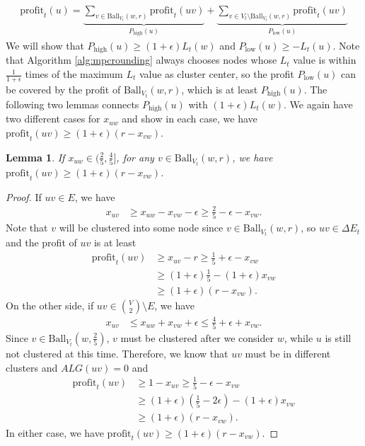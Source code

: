 \documentclass[11pt]{article}
\newtheorem{lemma}[theorem]{Lemma}
\newcommand{\ball}{\mathrm{Ball}}
\newcommand{\profit}{\mathrm{profit}}
\newcommand{\onefive}{\frac{1}{5}}
\newcommand{\twofive}{\frac{2}{5}}
\newcommand{\fourfive}{\frac{4}{5}}
\begin{document}
\begin{CJK*}{UTF8}{gbsn}
\begin{align*}
    \profit_t(u) = \underbrace{\sum_{v \in \ball_{V_t}(w, r)}\profit_t(uv)}_{P_{\textrm{high}}(u)} + \underbrace{\sum_{v \in V_t \setminus \ball_{V_t}(w, r)}\profit_t(uv)}_{P_{\textrm{low}}(u)}
\end{align*}
We will show that $P_{\textrm{high}}(u) \geq (1+\epsilon) L_t(w)$ and $P_{\textrm{low}}(u) \geq -L_t(u)$. Note that Algorithm \ref{alg:mpcrounding} always chooses nodes whose $L_t$ value is within $\frac{1}{1 + \epsilon}$ times of the maximum $L_t$ value as cluster center, so the profit $P_{\textrm{low}}(u)$ can be covered by the profit of $\ball_{V_t}(w, r)$, which is at least $P_{\textrm{high}}(u)$. The following two lemmas connects $P_{\textrm{high}}(u)$ with $(1+\epsilon) L_t(w)$. We again have two different cases for $x_{uw}$ and show in each case, we have $\profit_t(uv) \geq (1+\epsilon)(r - x_{vw})$.
\begin{lemma}
\label{lem:thirdcaseprofit}
If $x_{uw} \in (\twofive, \fourfive]$, for any $v \in \ball_{V_t}(w, r)$, we have $\profit_{t}(uv) \geq (1 + \epsilon)(r - x_{vw})$.
\end{lemma}
\begin{proof}
If $uv \in E$, we have 
\begin{align*}
    x_{uv} &\geq x_{uw} - x_{vw} - \epsilon \geq \twofive - \epsilon - x_{vw}.
\end{align*}
Note that $v$ will be clustered into some node since $v \in \ball_{V_t}(w, r)$, so $uv \in \Delta E_t$ and the profit of $uv$ is at least 
\begin{align*}
    \profit_{t}(uv) &\geq x_{uv} - r \geq \onefive + \epsilon - x_{vw} \\
    &\geq (1 + \epsilon)\onefive - (1 + \epsilon)x_{vw} \\
    &\geq (1 + \epsilon)(r - x_{vw}).
\end{align*}
On the other side, if $uv \in {V \choose 2} \setminus E$, we have 
\begin{align*}
    x_{uv} &\leq x_{uw} + x_{vw} + \epsilon \leq \fourfive + \epsilon + x_{vw}.
\end{align*}
Since $v \in \ball_{V_t}(w, \twofive)$, $v$ must be clustered after we consider $w$, while $u$ is still not clustered at this time. Therefore, we know that $uv$ must be in different clusters and $ALG(uv) = 0$ and 
\begin{align*}
    \profit_{t}(uv) &\geq 1 - x_{uv} \geq \onefive - \epsilon - x_{vw} \\
    &\geq (1 + \epsilon)(\onefive - 2\epsilon) - (1 + \epsilon)x_{vw} \\
    &\geq (1 + \epsilon)(r - x_{vw}).
\end{align*}
In either case, we have $\profit_{t}(uv) \geq (1 + \epsilon)(r - x_{vw})$.


\end{proof}
\end{CJK*}
\end{document}
